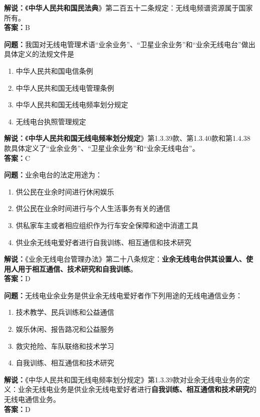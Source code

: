 \documentclass{ctexbook}
\begin{document}
\noindent\textbf{解说：}《\textbf{中华人民共和国民法典}》第二百五十二条规定：无线电频谱资源属于国家所有。\\\noindent\textbf{答案：}B

\bigskip


\noindent\textbf{问题：}我国对无线电管理术语“业余业务”、“卫星业余业务”和“业余无线电台”做出具体定义的法规文件是 
\begin{enumerate}[label=\Alph*), leftmargin=3em]
	\item 中华人民共和国电信条例
	\item 中华人民共和国无线电管理条例
	\item 中华人民共和国无线电频率划分规定
	\item 无线电台执照管理规定
\end{enumerate}
\textbf{解说：}《\textbf{中华人民共和国无线电频率划分规定}》第1.3.39款、第1.3.40款和第1.4.38款具体定义了“业余业务”、“卫星业余业务”和“业余无线电台”。\\\noindent\textbf{答案：}C

\bigskip


\noindent\textbf{问题：}业余电台的法定用途为：
\begin{enumerate}[label=\Alph*), leftmargin=3em]
	\item 供公民在业余时间进行休闲娱乐
	\item 供公民在业余时间进行与个人生活事务有关的通信
	\item 供私家车主或者相应组织作为行车安全保障和途中消遣工具
	\item 供业余无线电爱好者进行自我训练、相互通信和技术研究
\end{enumerate}
\noindent\textbf{解说：}《业余无线电台管理办法》第二十八条规定：\textbf{业余无线电台供其设置人、使用人用于相互通信、技术研究和自我训练}。\\\noindent\textbf{答案：}D


\bigskip


\noindent\textbf{问题：}无线电业余业务是供业余无线电爱好者作下列用途的无线电通信业务：
\begin{enumerate}[label=\Alph*), leftmargin=3em]
	\item 技术教学、民兵训练和公益通信
	\item 娱乐休闲、报告路况和公益服务
	\item 救灾抢险、车队联络和技术学习
	\item 自我训练、相互通信和技术研究
\end{enumerate}
\noindent\textbf{解说：}《中华人民共和国无线电频率划分规定》第1.3.39款对业余无线电业务的定义：业余无线电业务是供业余无线电爱好者进行\textbf{自我训练、相互通信和技术研究}的无线电通信业务。\\\noindent\textbf{答案：}D
\end{document}
